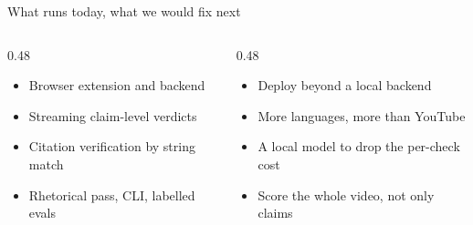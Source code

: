 \begin{frame}{What runs today, what we would fix next}
  \vspace{1.5mm}

  \begin{columns}[T]
    \begin{column}{0.48\textwidth}
      \vspace{1.5mm}
      \begin{itemize}
        \item Browser extension and backend
        \item Streaming claim-level verdicts
        \item Citation verification by string match
        \item Rhetorical pass, CLI, labelled evals
      \end{itemize}
    \end{column}
    \begin{column}{0.48\textwidth}
      \color{adminifaint}
      \vspace{1.5mm}
      \begin{itemize}
        \item Deploy beyond a local backend
        \item More languages, more than YouTube
        \item A local model to drop the per-check cost
        \item Score the whole video, not only claims
      \end{itemize}
    \end{column}
  \end{columns}

\end{frame}
